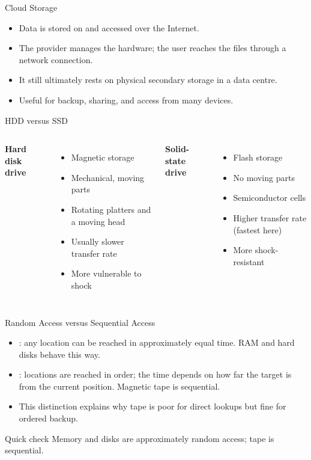 \documentclass[aspectratio=169]{beamer}
\begin{document}
\begin{frame}{Cloud Storage}
  \begin{itemize}
    \item Data is stored on  and accessed over the
      Internet.
    \item The provider manages the hardware; the user reaches the files
      through a network connection.
    \item It still ultimately rests on physical secondary storage in a data
      centre.
    \item Useful for backup, sharing, and access from many devices.
  \end{itemize}
\end{frame}

\begin{frame}{HDD versus SSD}
  \begin{columns}[T]
      \textbf{Hard disk drive}
      \begin{itemize}
        \item Magnetic storage
        \item Mechanical, moving parts
        \item Rotating platters and a moving head
        \item Usually slower transfer rate
        \item More vulnerable to shock
      \end{itemize}
      \textbf{Solid-state drive}
      \begin{itemize}
        \item Flash storage
        \item No moving parts
        \item Semiconductor cells
        \item Higher transfer rate (fastest here)
        \item More shock-resistant
      \end{itemize}
  \end{columns}
\end{frame}

\begin{frame}{Random Access versus Sequential Access}
  \begin{itemize}
    \item {}: any location can be reached in
      approximately equal time. RAM and hard disks behave this way.
    \item {}: locations are reached in order; the time
      depends on how far the target is from the current position. Magnetic
      tape is sequential.
    \item This distinction explains why tape is poor for direct lookups but
      fine for ordered backup.
  \end{itemize}
  \begin{block}{Quick check}
    Memory and disks are approximately random access; tape is sequential.
  \end{block}
\end{frame}
\end{document}
